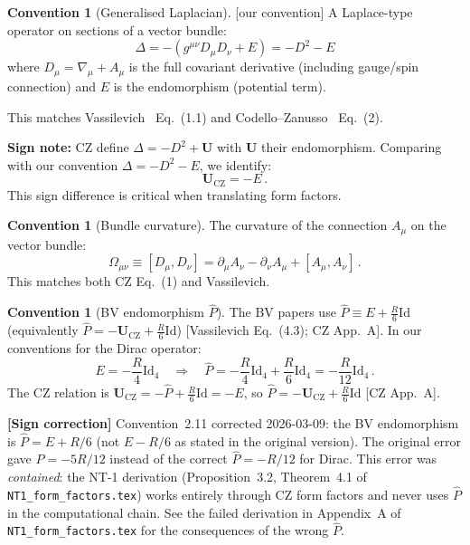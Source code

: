 \documentclass[12pt,a4paper]{article}
\theoremstyle{definition}
\newtheorem{convention}[proposition]{Convention}
\theoremstyle{remark}
\newcommand{\Id}{\mathrm{Id}}
\newcommand{\fromlit}[1]{\textcolor{blue!70!black}{\textsf{[#1]}}}
\newcommand{\oursign}{\textcolor{teal!80!black}{\textsf{[our convention]}}}
\newcommand{\signcorrection}[1]{%
  \par\noindent\colorbox{red!10}{%
    \parbox{\dimexpr\linewidth-2\fboxsep}{%
      \textcolor{red!50!black}{\textbf{[Sign correction]}}
      \textcolor{red!50!black}{#1}%
    }%
  }\par%
}
\begin{document}
\begin{convention}[Generalised Laplacian]
\label{conv:laplacian}
\oursign\;
A Laplace-type operator on sections of a vector bundle:
\begin{equation}
  \boxed{
  \Delta = -(g^{\mu\nu}D_\mu D_\nu + E)
  = -D^2 - E
  }
  \label{eq:laplacian}
\end{equation}
where $D_\mu = \nabla_\mu + A_\mu$ is the full covariant derivative
(including gauge/spin connection) and $E$ is the endomorphism (potential
term).

This matches Vassilevich~\cite{Vassilevich2003} Eq.~(1.1) and
Codello--Zanusso~\cite{CZ2012} Eq.~(2).

\medskip\noindent
\textbf{Sign note:} CZ define $\Delta = -D^2 + \mathbf{U}$ with
$\mathbf{U}$ their endomorphism.  Comparing with our convention
$\Delta = -D^2 - E$, we identify:
\begin{equation}
  \mathbf{U}_{\text{CZ}} = -E\,.
  \label{eq:U-vs-E}
\end{equation}
This sign difference is critical when translating form factors.
\end{convention}

\begin{convention}[Bundle curvature]
The curvature of the connection $A_\mu$ on the vector bundle:
\begin{equation}
  \Omega_{\mu\nu} \equiv [D_\mu, D_\nu]
  = \partial_\mu A_\nu - \partial_\nu A_\mu + [A_\mu, A_\nu]\,.
  \label{eq:bundle-curv}
\end{equation}
This matches both CZ Eq.~(1) and Vassilevich.
\end{convention}

\begin{convention}[BV endomorphism $\hat{P}$]
\label{conv:Phat}
The BV papers use $\hat{P} \equiv E + \frac{R}{6}\Id$
(equivalently $\hat{P} = -\mathbf{U}_{\text{CZ}} + \frac{R}{6}\Id$)
\fromlit{Vassilevich Eq.~(4.3); CZ App.~A}.
In our conventions for the Dirac operator:
\begin{equation}
  E = -\frac{R}{4}\Id_4
  \quad\Longrightarrow\quad
  \hat{P} = -\frac{R}{4}\Id_4 + \frac{R}{6}\Id_4
  = -\frac{R}{12}\Id_4\,.
  \label{eq:Phat-dirac}
\end{equation}
The CZ relation is $\mathbf{U}_{\text{CZ}} = -\hat{P} + \frac{R}{6}\Id = -E$,
so $\hat{P} = -\mathbf{U}_{\text{CZ}} + \frac{R}{6}\Id$ \fromlit{CZ App.~A}.

\signcorrection{Convention~2.11 corrected 2026-03-09: the BV endomorphism
is $\hat{P} = E + R/6$ (not $E - R/6$ as stated in the original version).
The original error gave $\hat{P} = -5R/12$ instead of the correct
$\hat{P} = -R/12$ for Dirac.  This error was \emph{contained}:
the NT-1 derivation (Proposition~3.2, Theorem~4.1 of
\texttt{NT1\_form\_factors.tex}) works entirely through CZ form factors
and never uses $\hat{P}$ in the computational chain.  See the failed
derivation in Appendix~A of \texttt{NT1\_form\_factors.tex} for the
consequences of the wrong $\hat{P}$.}
\end{convention}
\end{document}
